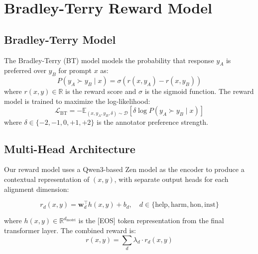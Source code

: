 \documentclass[11pt,a4paper]{article}
\begin{document}
\section{Bradley-Terry Reward Model}
\label{sec:reward_model}

\subsection{Bradley-Terry Model}

The Bradley-Terry (BT) model \cite{bradley1952rank} models the probability that response
$y_A$ is preferred over $y_B$ for prompt $x$ as:
\begin{equation}
    P(y_A \succ y_B \mid x) = \sigma(r(x, y_A) - r(x, y_B))
    \label{eq:bt}
\end{equation}
where $r(x, y) \in \mathbb{R}$ is the reward score and $\sigma$ is the sigmoid function.
The reward model is trained to maximize the log-likelihood:
\begin{equation}
    \mathcal{L}_{\text{BT}} = -\mathbb{E}_{(x, y_A, y_B, \delta) \sim \mathcal{D}}\!\left[
    \delta \log P(y_A \succ y_B \mid x)\right]
    \label{eq:bt_loss}
\end{equation}
where $\delta \in \{-2, -1, 0, +1, +2\}$ is the annotator preference strength.

\subsection{Multi-Head Architecture}

Our reward model uses a Qwen3-based Zen model as the encoder to produce a contextual
representation of $(x, y)$, with separate output heads for each alignment dimension:

\begin{equation}
    r_d(x, y) = \mathbf{w}_d^\top h(x, y) + b_d, \quad
    d \in \{\text{help}, \text{harm}, \text{hon}, \text{inst}\}
    \label{eq:multi_head}
\end{equation}

where $h(x, y) \in \mathbb{R}^{d_{\text{model}}}$ is the [EOS] token representation
from the final transformer layer. The combined reward is:
\begin{equation}
    r(x, y) = \sum_d \lambda_d \cdot r_d(x, y)
    \label{eq:combined}
\end{equation}
\end{document}
